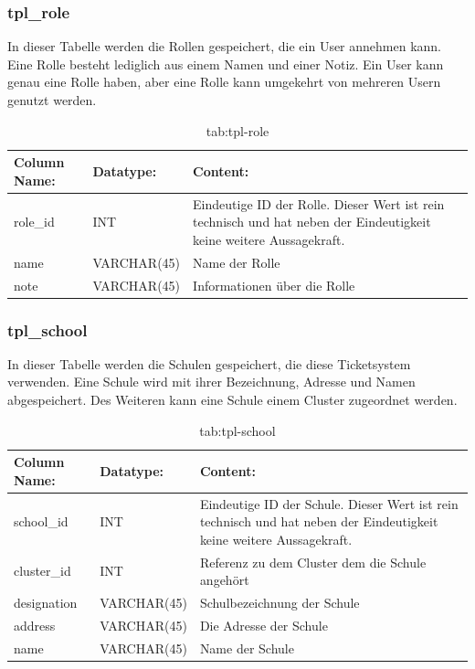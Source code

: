 \newpage

\subsubsection{tpl\_role}

In dieser Tabelle werden die Rollen gespeichert, die ein User annehmen kann. Eine Rolle besteht lediglich aus einem Namen und einer Notiz. Ein User kann genau eine Rolle haben, aber eine Rolle kann umgekehrt von mehreren Usern genutzt werden.

\begin{table}[h]
	\begin{tabular}{|p{3.5cm}|p{4cm}|p{6.2cm}|}
		\hline
		\textbf{Column Name:} & \textbf{Datatype:} & \textbf{Content:}\\
		\hline
		role\_id & INT & Eindeutige ID der Rolle. Dieser Wert ist rein technisch und hat neben der Eindeutigkeit keine weitere Aussagekraft.\\
		\hline
		name & VARCHAR(45) & Name der Rolle\\
		\hline
		note & VARCHAR(45) & Informationen über die Rolle\\
		\hline
	\end{tabular}
	\caption{tab:tpl-role}
\end{table}
\label{tab:tpl_role}


\subsubsection{tpl\_school}

In dieser Tabelle werden die Schulen gespeichert, die diese Ticketsystem verwenden.
Eine Schule wird mit ihrer Bezeichnung, Adresse und Namen abgespeichert. Des Weiteren kann eine Schule einem Cluster zugeordnet werden. 

\begin{table}[h]
	\begin{tabular}{|p{3.5cm}|p{4cm}|p{6.2cm}|}
		\hline
		\textbf{Column Name:} & \textbf{Datatype:} & \textbf{Content:}\\
		\hline
		school\_id & INT & Eindeutige ID der Schule. Dieser Wert ist rein technisch und hat neben der Eindeutigkeit keine weitere Aussagekraft.\\
		\hline
		cluster\_id & INT & Referenz zu dem Cluster dem die Schule angehört\\
		\hline
		designation & VARCHAR(45) & Schulbezeichnung der Schule\\
		\hline
		address & VARCHAR(45) & Die Adresse der Schule\\
		\hline
		name & VARCHAR(45) & Name der Schule\\
		\hline
	\end{tabular}
	\caption{tab:tpl-school}
\end{table}
\label{tab:tpl_school}

